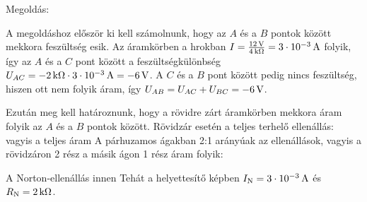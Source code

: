 
\ifdefined\megoldas

 Megoldás: 

 A megoldáshoz először ki kell számolnunk, hogy az $A$ és a $B$ pontok között mekkora feszültség esik. Az áramkörben a hrokban $I=\frac{12\mathrm{\, V}}{4\mathrm{\, k\Omega}}=3\cdot 10^{-3}\mathrm{\, A}$ folyik, így az $A$ és a $C$ pont között a feszültségkülönbség $U_{AC}=-2\mathrm{\, k\Omega}\cdot 3\cdot 10^{-3}\mathrm{\, A}=-6\mathrm{\, V}$. A $C$ és a $B$ pont között pedig nincs feszültség, hiszen ott nem folyik áram, így $U_{AB}=U_{AC}+U_{BC}=-6\mathrm{\, V}$.

 Ezután meg kell határoznunk, hogy a rövidre zárt áramkörben mekkora áram folyik az $A$ és a $B$ pontok között. Rövidzár esetén a teljes terhelő ellenállás:
 vagyis a teljes áram
 A párhuzamos ágakban 2:1 arányúak az ellenállások, vagyis a rövidzáron 2 rész a másik ágon 1 rész áram folyik:

 A Norton-ellenállás innen
 Tehát a helyettesítő képben $I_\text{N}=3\cdot 10^{-3}\mathrm{\, A}$ és $R_\text{N}=2\mathrm{\, k\Omega}$.

\fi